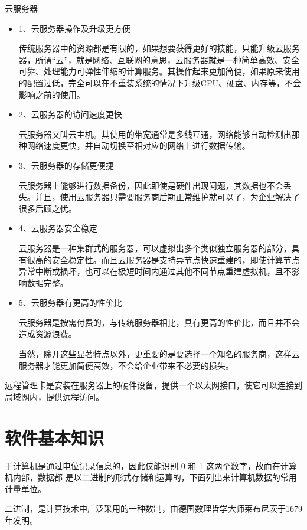 \begin{ascolorbox17}{云服务器}

\begin{itemize}
	\item 1、云服务器操作及升级更方便
	
	传统服务器中的资源都是有限的，如果想要获得更好的技能，只能升级云服务器，所谓“云”，就是网络、互联网的意思，云服务器就是一种简单高效、安全可靠、处理能力可弹性伸缩的计算服务。其操作起来更加简便，如果原来使用的配置过低，完全可以在不重装系统的情况下升级CPU、硬盘、内存等，不会影响之前的使用。
	
	\item 2、云服务器的访问速度更快
	
	云服务器又叫云主机。其使用的带宽通常是多线互通，网络能够自动检测出那种网络速度更快，并自动切换至相对应的网络上进行数据传输。
	
	\item 3、云服务器的存储更便捷
	
	云服务器上能够进行数据备份，因此即使是硬件出现问题，其数据也不会丢失。并且，使用云服务器只需要服务商后期正常维护就可以了，为企业解决了很多后顾之忧。
	
	\item 4、云服务器安全稳定
	
	云服务器是一种集群式的服务器，可以虚拟出多个类似独立服务器的部分，具有很高的安全稳定性。而且云服务器是支持异节点快速重建的，即使计算节点异常中断或损坏，也可以在极短时间内通过其他不同节点重建虚拟机，且不影响数据完整。
	
	\item 5、云服务器有更高的性价比
	
	云服务器是按需付费的，与传统服务器相比，具有更高的性价比，而且并不会造成资源浪费。
	
	当然，除开这些显著特点以外，更重要的是要选择一个知名的服务商，这样云服务器才能更加简便高效，不会给企业带来不必要的损失。
\end{itemize}
\end{ascolorbox17}
远程管理卡是安装在服务器上的硬件设备，提供一个以太网接口，使它可以连接到局域网内，提供远程访问。

\section{软件基本知识}
于计算机是通过电位记录信息的，因此仅能识别 0 和 1 这两个数字，故而在计算机内部，数据都 是以二进制的形式存储和运算的，下面列出来计算机数据的常用计量单位。

二进制，是计算技术中广泛采用的一种数制，由德国数理哲学大师莱布尼茨于1679年发明。

